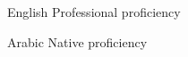 
\begin{cvlanguages}
	\cvlanguage
	{English} %
	{Professional proficiency} %

	\cvlanguage
	{Arabic} %
	{Native proficiency} %
\end{cvlanguages}
